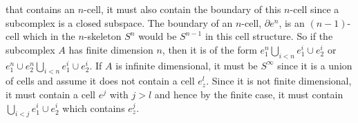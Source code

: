 \documentclass[a4paper]{article}
\begin{document}
that contains an $n$-cell, it must also contain the boundary of this $n$-cell
since a subcomplex is a closed subspace. The boundary of an $n$-cell,
$\partial e^{n}$, is an $(n-1)$-cell which in the $n$-skeleton $S^{n}$ would be
$S^{n-1}$ in this cell structure. So if the subcomplex $A$ has finite dimension
$n$, then it is of the form $e_1^{n} \bigcup_{i<n} e_1^{i}\cup e_2^{i}$ or
$e_1^{n}\cup e_2^{n} \bigcup_{i<n} e_1^{i}\cup e_2^{i}$. If $A$ is infinite
dimensional, it must be $S^{\infty}$ since it is a union of cells and assume it
does not contain a cell $e_{z}^{l}$. Since it is not finite dimensional, it must
contain a cell $e^{j}$ with $j>l$ and hence by the finite case, it must contain
$\bigcup_{i < j} e_1^{i}\cup e_2^{i}$ which contains $e_{z}^{j}$.
          
\end{document}
